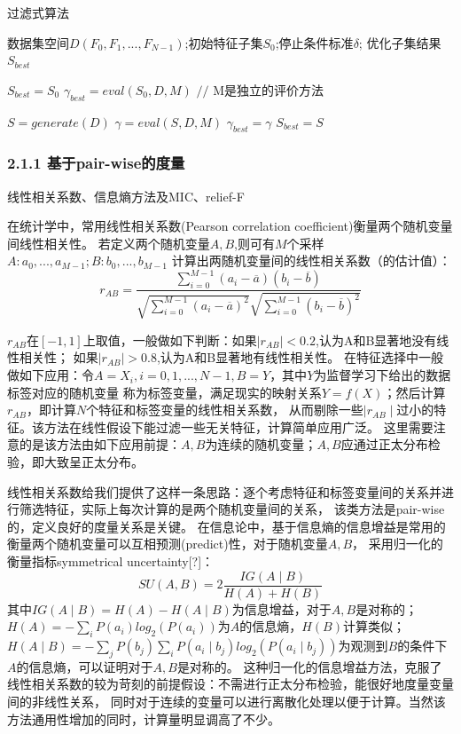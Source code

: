 \documentclass[a4paper,UTF8]{article}
\begin{document}
  \begin{algorithm}
    \caption{过滤式算法}
    \begin{algorithmic}[1]
      \REQUIRE 数据集空间$D(F_{0}, F_{1},..., F_{N-1})$;初始特征子集$S_{0}$;停止条件标准$\delta$;
      \ENSURE 优化子集结果$S_{best}$

      \STATE $S_{best}=S_{0}$
      \STATE $\gamma_{best}=eval(S_{0},D,M)$          $//$ M是独立的评价方法

        \STATE $S=generate(D)$
        \STATE $\gamma=eval(S,D,M)$
            \STATE $\gamma_{best}=\gamma$
            \STATE $S_{best}=S$
          \ENDIF
      \ENDWHILE


    \end{algorithmic}
  \end{algorithm}


\subsubsection*{2.1.1 基于pair-wise的度量}
  线性相关系数、信息熵方法及MIC、relief-F

  在统计学中，常用线性相关系数(Pearson correlation coefficient)衡量两个随机变量间线性相关性。
  若定义两个随机变量$ A, B $,则可有$M$个采样$ A: a_{0},...,a_{M-1}; B: b_{0},...,b_{M-1}$
  计算出两随机变量间的线性相关系数（的估计值）：
  $$  r_{AB} = \frac{\sum_{i=0}^{M-1}(a_{i}-\overline{a})(b_{i}-\overline{b})}
  {\sqrt{\sum_{i=0}^{M-1}(a_{i}-\overline{a})^2}\sqrt{\sum_{i=0}^{M-1}(b_{i}-\overline{b})^2}}$$

  $ r_{AB} $在$ [-1,1]$上取值，一般做如下判断：如果$ \mid{r_{AB}}\mid<0.2$,认为A和B显著地没有线性相关性；
  如果$ \mid{r_{AB}}\mid>0.8$,认为A和B显著地有线性相关性。
  在特征选择中一般做如下应用：令$ A=X_{i},i=0,1,...,N-1, B=Y$，其中$Y$为监督学习下给出的数据标签对应的随机变量
  称为标签变量，满足现实的映射关系$Y=f(X)$；然后计算$ r_{AB} $，即计算$N$个特征和标签变量的线性相关系数，
  从而剔除一些$\mid{r_{AB}}\mid$过小的特征。该方法在线性假设下能过滤一些无关特征，计算简单应用广泛。
  这里需要注意的是该方法由如下应用前提：$A,B$为连续的随机变量；$A,B$应通过正太分布检验，即大致呈正太分布。

  线性相关系数给我们提供了这样一条思路：逐个考虑特征和标签变量间的关系并进行筛选特征，实际上每次计算的是两个随机变量间的关系，
  该类方法是pair-wise的，定义良好的度量关系是关键。
  在信息论中，基于信息熵的信息增益是常用的衡量两个随机变量可以互相预测(predict)性，对于随机变量$ A, B $，
  采用归一化的衡量指标symmetrical uncertainty[?]：
  $$ SU(A, B) = 2 \frac{IG(A \mid B)}{H(A)+H(B)} $$
  其中$IG(A \mid B)=H(A)-H(A \mid B)$为信息增益，对于$A,B$是对称的；
  $H(A)=-\sum_{i}P(a_{i})log_{2}(P(a_{i}))$为$A$的信息熵，$H(B)$计算类似；
  $H(A \mid B)=-\sum_{j}P(b_{j})\sum_{i}P(a_{i} \mid b_{j})log_{2}(P(a_{i} \mid b_{j}))$为观测到$B$的条件下
  $A$的信息熵，可以证明对于$A,B$是对称的。
  这种归一化的信息增益方法，克服了线性相关系数的较为苛刻的前提假设：不需进行正太分布检验，能很好地度量变量间的非线性关系，
  同时对于连续的变量可以进行离散化处理以便于计算。当然该方法通用性增加的同时，计算量明显调高了不少。
\end{document}
